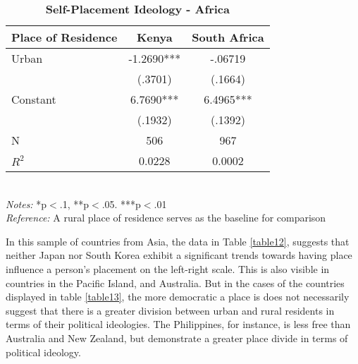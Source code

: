 \documentclass[12pt, titlepage]{article}
\newcommand\e{\emph}
\newcommand\tb{\textbf}
\begin{document}
\begin{singlespace}
	\begin{table}[H]
		\centering
		\caption{\tb{Self-Placement Ideology - Africa}}
		\begin{tabulary}{\linewidth}{l c c}
			\\
			\hline
			\tb{Place of Residence} & \tb{Kenya}& \tb{South Africa} \\
			\hline
			Urban&-1.2690*** &-.06719 \\
			&(.3701)  &(.1664)\\
			Constant&6.7690*** &6.4965*** \\
			& (.1932) & (.1392) \\
			N&506 & 967\\
			$R^2$&0.0228 &0.0002 \\
			\hline
		\end{tabulary}
		\\
		\e{Notes:} *p$<$.1, **p$<$.05. ***p$<$.01 \\
		\e{Reference:} A rural place of residence serves as the baseline for comparison
		\label{table11}
	\end{table}
\end{singlespace}


In this sample of countries from Asia, the data in Table \ref{table12}, suggests that neither Japan nor South Korea exhibit a significant trends towards having place influence a person's placement on the left-right scale. This is also visible in countries in the Pacific Island, and Australia. But in the cases of the countries displayed in table \ref{table13}, the more democratic a place is does not necessarily suggest that there is a greater division between urban and rural residents in terms of their political ideologies. The Philippines, for instance, is less free than Australia and New Zealand, but demonstrate a greater place divide in terms of political ideology.
\end{document}
